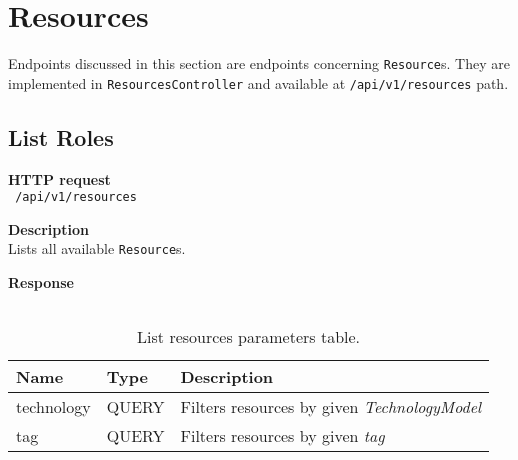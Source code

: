 \section{Resources}
Endpoints discussed in this section are endpoints concerning \texttt{Resource}s.
They are implemented in \texttt{ResourcesController} and available at \texttt{/api/v1/resources} path.

\subsection{List Roles}
\begin{description}
    \item \textbf{HTTP request}\\
        \texttt{\text{[GET]} /api/v1/resources}
    \item \textbf{Description}\\
        Lists all available \texttt{Resource}s.
    \item \textbf{Response}\\
        \texttt{\text{[200 OK]} \text{[ResourceModel]}}
\end{description}
\begin{table}[ht!]
    \begin{tabularx}{\textwidth}{llX}
        \toprule
        Name & Type & Description \\
        \midrule
        technology & QUERY & Filters resources by given \emph{TechnologyModel} \\  
        tag & QUERY & Filters resources by given \emph{tag}
        \end{tabularx}
    \caption{List resources parameters table.}
\end{table}

